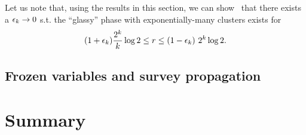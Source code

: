 \documentclass[letterpaper, 10pt, twocolumn, reqno]{amsart}
\begin{document}
Let us note that, using the results in this section, we can show~\cite{achlioptas2008algorithmic} that there exists a $\epsilon_k \to 0$ s.t. the ``glassy'' phase with exponentially-many clusters exists for
$$
(1 +\epsilon_k) \frac{2^k}{k} \log 2 \leq r \leq (1-\epsilon_k)\ 2^k \log 2.
$$


\subsection{Frozen variables and survey propagation}
\label{ssec:frozen_variables}


\section{Summary}
\label{sec:summary}


{
\small


}
\end{document}
